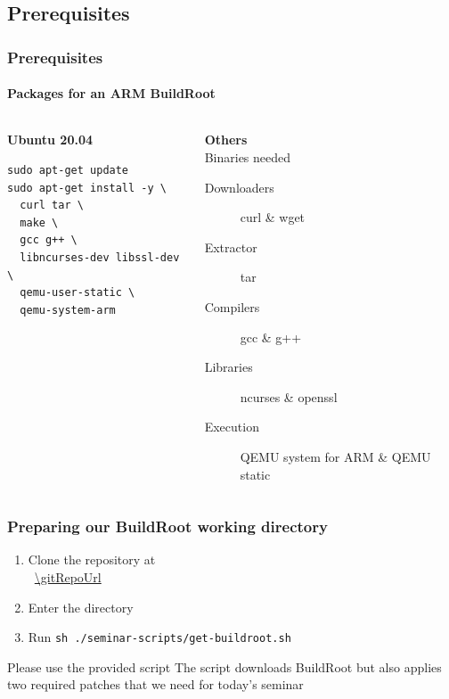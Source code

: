 \subsection{Prerequisites}
\begin{frame}[fragile]
  \frametitle{Prerequisites}
  \framesubtitle{Packages for an ARM BuildRoot}
  \begin{columns}[t]
    \begin{column}{.5\textwidth}
      \textbf{Ubuntu 20.04}
      \begin{verbatim}
sudo apt-get update
sudo apt-get install -y \
  curl tar \
  make \
  gcc g++ \
  libncurses-dev libssl-dev \
  qemu-user-static \
  qemu-system-arm
      \end{verbatim}
    \end{column}
    \begin{column}{.5\textwidth}
      \textbf{Others} \\
      {\small Binaries needed}
      \begin{description}
        \item[Downloaders] curl \& wget
        \item[Extractor] tar
        \item[Compilers] gcc \& g++
        \item[Libraries] ncurses \& openssl
        \item[Execution] QEMU system for ARM \& QEMU static
      \end{description}
    \end{column}
  \end{columns}
\end{frame}
\begin{frame}
  \frametitle{Preparing our BuildRoot working directory}
  \begin{enumerate}
    \item Clone the repository at \\ \mbox{ \url{\gitRepoUrl} }
    \item Enter the directory
    \item Run \texttt{sh ./seminar-scripts/get-buildroot.sh}
  \end{enumerate}
  \begin{alertblock}{Please use the provided script}
    The script downloads BuildRoot \buildrootLatestVersion \; but also applies two required patches that we need for today's seminar
  \end{alertblock}
\end{frame}
